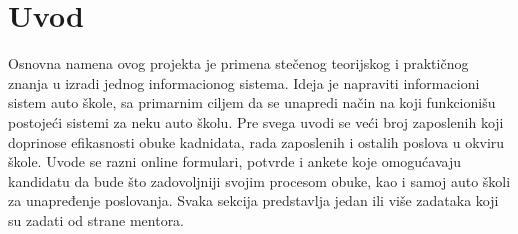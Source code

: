 \section{Uvod}
\label{sec:uvod}

Osnovna namena ovog projekta je primena stečenog teorijskog i praktičnog znanja u izradi jednog informacionog sistema. Ideja je napraviti informacioni sistem auto škole, sa primarnim ciljem da se unapredi način na koji funkcionišu postojeći sistemi za neku auto školu. Pre svega uvodi se veći broj zaposlenih koji doprinose efikasnosti obuke kadnidata, rada zaposlenih i ostalih poslova u okviru škole. Uvode se razni online formulari, potvrde i ankete koje omogućavaju kandidatu da bude što zadovoljniji svojim procesom obuke, kao  i samoj auto školi za unapređenje poslovanja.
Svaka sekcija predstavlja jedan ili više zadataka koji su zadati od strane mentora.